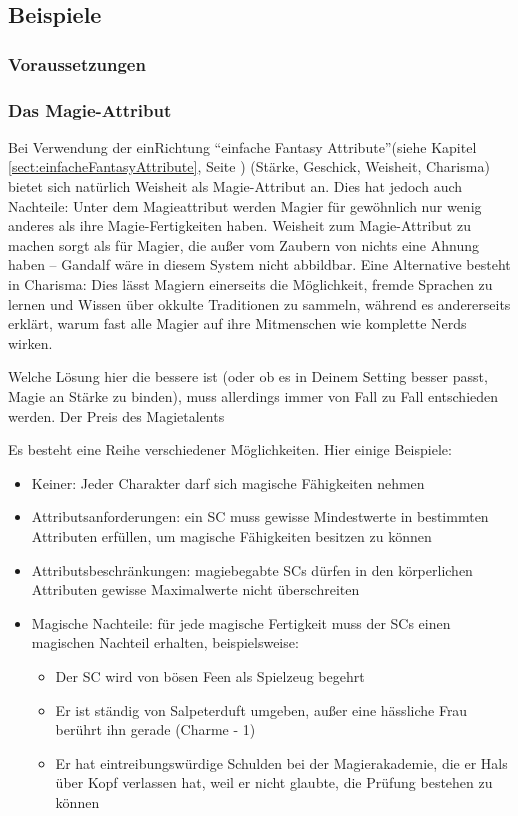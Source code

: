 \subsection{Beispiele}
\subsubsection{Voraussetzungen}

 
\subsubsection{Das Magie-Attribut}

Bei Verwendung der einRichtung "`einfache Fantasy Attribute"'(siehe Kapitel \ref {sect:einfacheFantasyAttribute}, Seite \pageref {sect:einfacheFantasyAttribute}) (Stärke, Geschick, Weisheit, Charisma) bietet sich natürlich Weisheit als Magie-Attribut an. Dies hat jedoch auch Nachteile: Unter dem Magieattribut werden Magier für gewöhnlich nur wenig anderes als ihre Magie-Fertigkeiten haben. Weisheit zum Magie-Attribut zu machen sorgt als für Magier, die außer vom Zaubern von nichts eine Ahnung haben -- Gandalf wäre in diesem System nicht abbildbar.
Eine Alternative besteht in Charisma: Dies lässt Magiern einerseits die Möglichkeit, fremde Sprachen zu lernen und Wissen über okkulte Traditionen zu sammeln, während es andererseits erklärt, warum fast alle Magier auf ihre Mitmenschen wie komplette Nerds wirken.

Welche Lösung hier die bessere ist (oder ob es in Deinem Setting besser passt, Magie an Stärke zu binden), muss allerdings immer von Fall zu Fall entschieden werden.
Der Preis des Magietalents

Es besteht eine Reihe verschiedener Möglichkeiten. Hier einige Beispiele:
\begin{itemize}
\item Keiner: Jeder Charakter darf sich magische Fähigkeiten nehmen
\item Attributsanforderungen: ein SC muss gewisse Mindestwerte in bestimmten Attributen erfüllen, um magische Fähigkeiten besitzen zu können
\item Attributsbeschränkungen: magiebegabte SCs dürfen in den körperlichen Attributen gewisse Maximalwerte nicht überschreiten
\item Magische Nachteile: für jede magische Fertigkeit muss der SCs einen magischen Nachteil erhalten, beispielsweise:
\begin{itemize} 
\item Der SC wird von bösen Feen als Spielzeug begehrt
\item Er ist ständig von Salpeterduft umgeben, außer eine hässliche Frau berührt ihn gerade (Charme - 1)
\item Er hat eintreibungswürdige Schulden bei der Magierakademie, die er Hals über Kopf verlassen hat, weil er nicht glaubte, die Prüfung bestehen zu können
\end{itemize}
\end{itemize}


